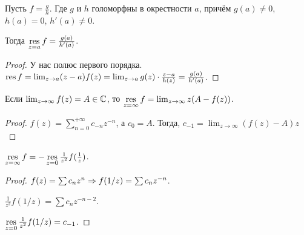 \begin{property}
    Пусть $f = \frac{g}{h}$.
    Где $g$ и $h$ голоморфны в окрестности $a$, причём
    $g(a) \ne 0$, $h(a) = 0$, $h'(a) \ne 0$.

    Тогда $\operatorname*{res}\limits_{z = a} f = \frac{g(a)}{h'(a)}$.
\end{property}

\begin{proof}
    У нас полюс первого порядка.
    $\operatorname*{res} f = \lim_{z\to a} (z-a) f(z)
        = \lim_{z\to a} g(z) \cdot \frac{z-a}{h(z)}
        = \frac{g(a)}{h'(a)}$.
\end{proof}

\begin{property}
    Если $\lim_{z\to\infty} f(z) = A \in \mathbb{C}$,
    то $\operatorname*{res}\limits_{z=\infty} f = \lim_{z\to\infty} z(A-f(z))$.
\end{property}

\begin{proof}
    $f(z) = \sum\limits_{n=0}^{+\infty} c_{-n}z^{-n}$,
    а $c_0 = A$. Тогда,
    $c_{-1} = \lim_{z\to\infty} (f(z) - A)z$
\end{proof}

\begin{property}
    $\operatorname*{res}\limits_{z=\infty} f = - \operatorname*{res}\limits_{z=0} \frac{1}{z^2} f(\frac{1}{z})$.
\end{property}

\begin{proof}
    $f(z) = \sum c_nz^n \Rightarrow f(1/z) = \sum c_nz^{-n}$.

    $\frac{1}{z^2}f(1/z) = \sum c_nz^{-n-2}$.

    $\operatorname*{res}\limits_{z=0} \frac{1}{z^2} f(1/z) = c_{-1}$.
\end{proof}

\newpage
